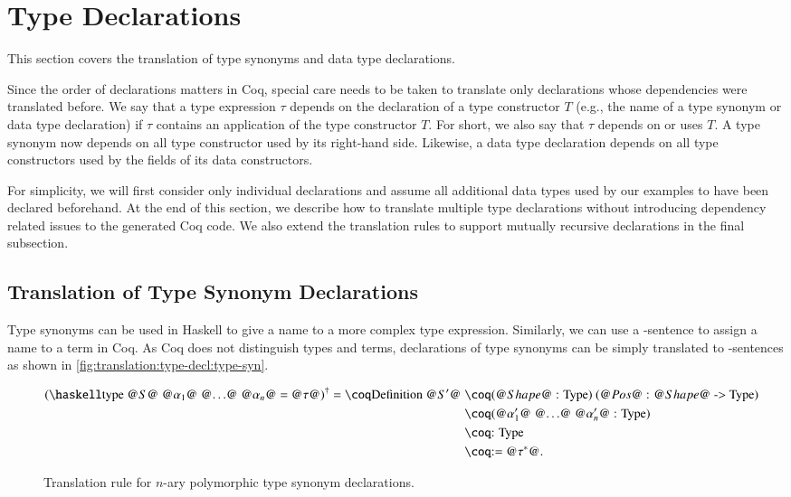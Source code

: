 \section{Type Declarations} \label{sec:translation:type-decl}
This section covers the translation of type synonyms and data type declarations.

Since the order of declarations matters in Coq, special care needs to be taken to translate only declarations whose dependencies were translated before.
We say that a type expression $\tau$ depends on the declaration of a type constructor $T$ (e.g., the name of a type synonym or data type declaration) if $\tau$ contains an application of the type constructor $T$.
For short, we also say that $\tau$ depends on or uses $T$.
A type synonym now depends on all type constructor used by its right-hand side.
Likewise, a data type declaration depends on all type constructors used by the fields of its data constructors.

For simplicity, we will first consider only individual declarations and assume all additional data types used by our examples to have been declared beforehand.
At the end of this section, we describe how to translate multiple type declarations without introducing dependency related issues to the generated Coq code.
We also extend the translation rules to support mutually recursive declarations in the final subsection.

\subsection{Translation of Type Synonym Declarations} \label{sec:translation:type-decl:type-syn}
Type synonyms can be used in Haskell to give a name to a more complex type expression.
Similarly, we can use a -sentence to assign a name to a term in Coq.
As Coq does not distinguish types and terms, declarations of type synonyms can be simply translated to -sentences as shown in \autoref{fig:translation:type-decl:type-syn}.

\begin{figure}[H]
  \begin{align*}
    \toCoq{(
      \haskellM{type @$S$@ @$\alpha_1$@ @$\ldots$@ @$\alpha_n$@ = @$\tau$@}
     )}
    = \coqM{Definition @$S'$@} &\;\coqM{(@$\Shape$@ : Type) (@$\Pos$@ : @$\Shape$@ -> Type)           } \\
                               &\;\coqM{(@$\alpha_1'$@ @$\ldots$@ @$\alpha_n'$@ : Type)} \\
                               &\;\coqM{: Type                                         } \\
                               &\;\coqM{:= @$\toCoqTX{\tau}$@.                             }
  \end{align*}
  \caption{Translation rule for $n$-ary polymorphic type synonym declarations.}
  \label{fig:translation:type-decl:type-syn}
\end{figure}

